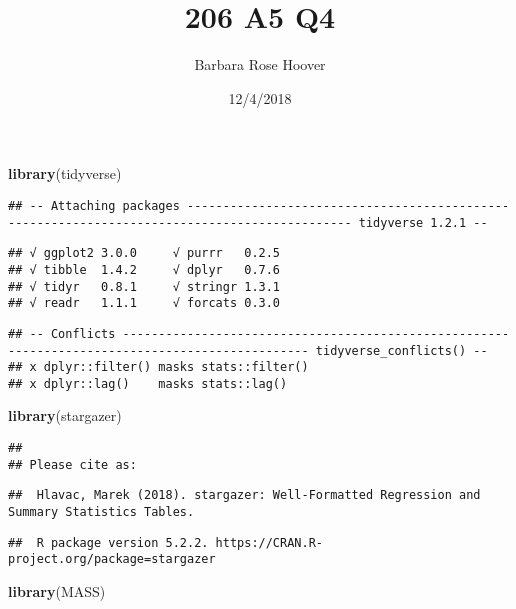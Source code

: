 \documentclass[]{article}
\title{206 A5 Q4}
\author{Barbara Rose Hoover}
\date{12/4/2018}
\newenvironment{Shaded}{\begin{snugshade}}{\end{snugshade}}
\newcommand{\KeywordTok}[1]{\textcolor[rgb]{0.13,0.29,0.53}{\textbf{#1}}}
\newcommand{\NormalTok}[1]{#1}
\begin{document}
\maketitle

\begin{Shaded}
\begin{Highlighting}[]
\KeywordTok{library}\NormalTok{(tidyverse)}
\end{Highlighting}
\end{Shaded}

\begin{verbatim}
## -- Attaching packages --------------------------------------------------------------------------------------------- tidyverse 1.2.1 --
\end{verbatim}

\begin{verbatim}
## √ ggplot2 3.0.0     √ purrr   0.2.5
## √ tibble  1.4.2     √ dplyr   0.7.6
## √ tidyr   0.8.1     √ stringr 1.3.1
## √ readr   1.1.1     √ forcats 0.3.0
\end{verbatim}

\begin{verbatim}
## -- Conflicts ------------------------------------------------------------------------------------------------ tidyverse_conflicts() --
## x dplyr::filter() masks stats::filter()
## x dplyr::lag()    masks stats::lag()
\end{verbatim}

\begin{Shaded}
\begin{Highlighting}[]
\KeywordTok{library}\NormalTok{(stargazer)}
\end{Highlighting}
\end{Shaded}

\begin{verbatim}
## 
## Please cite as:
\end{verbatim}

\begin{verbatim}
##  Hlavac, Marek (2018). stargazer: Well-Formatted Regression and Summary Statistics Tables.
\end{verbatim}

\begin{verbatim}
##  R package version 5.2.2. https://CRAN.R-project.org/package=stargazer
\end{verbatim}

\begin{Shaded}
\begin{Highlighting}[]
\KeywordTok{library}\NormalTok{(MASS)}
\end{Highlighting}
\end{Shaded}
\end{document}
